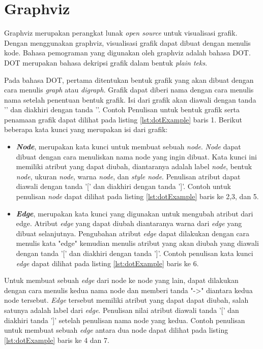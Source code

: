 \section{Graphviz}\cite{Graph}
Graphviz merupakan perangkat lunak \textsl{open source} untuk visualisasi grafik. Dengan menggunakan graphviz, visualisasi grafik dapat dibuat dengan menulis kode. Bahasa pemograman yang digunakan oleh graphviz adalah bahasa DOT. DOT merupakan bahasa dekripsi grafik dalam bentuk \textsl{plain teks}. 

Pada bahasa DOT, pertama ditentukan bentuk grafik yang akan dibuat dengan cara menulis \textsl{graph} atau \textsl{digraph}. Grafik dapat diberi nama dengan cara menulis nama setelah penentuan bentuk grafik. Isi dari grafik akan diawali dengan tanda '{' dan diakhiri dengan tanda '}'. Contoh Penulisan untuk bentuk grafik serta penamaan grafik dapat dilihat pada listing \ref{lst:dotExample} baris 1. Berikut beberapa kata kunci yang merupakan isi dari grafik:

\begin{itemize}
	\item \textbf{\textsl{Node}}, merupakan kata kunci untuk membuat sebuah \textsl{node}. \textsl{Node} dapat dibuat dengan cara menuliskan nama node yang ingin dibuat. Kata kunci ini memiliki atribut yang dapat diubah, diantaranya adalah label \textsl{node}, bentuk \textsl{node}, ukuran \textsl{node}, warna \textsl{node}, dan \textsl{style node}. Penulisan atribut dapat diawali dengan tanda '[' dan diakhiri dengan tanda ']'. Contoh untuk penulisan \textsl{node} dapat dilihat pada listing \ref{lst:dotExample} baris ke 2,3, dan 5.
	\item \textbf{\textsl{Edge}}, merupakan kata kunci yang digunakan untuk mengubah atribut dari edge. Atribut \textsl{edge} yang dapat diubah diantaranya warna dari \textsl{edge} yang dibuat selanjutnya. Pengubahan atribut \textsl{edge} dapat dilakukan dengan cara menulis kata "edge" kemudian menulis atribut yang akan diubah yang diawali dengan tanda '[' dan diakhiri dengan tanda ']'. Contoh penulisan kata kunci \textsl{edge} dapat dilihat pada listing \ref{lst:dotExample} baris ke 6.
\end{itemize}

Untuk membuat sebuah \textsl{edge} dari node ke node yang lain, dapat dilakukan dengan cara menulis kedua nama node dan memberi tanda "->" diantara kedua node tersebut. \textsl{Edge} tersebut memiliki atribut yang dapat dapat diubah, salah satunya adalah label dari \textsl{edge}. Penulisan nilai atribut diawali tanda '[' dan diakhiri tanda ']' setelah penulisan nama node yang kedua. Contoh penulisan untuk membuat sebuah \textsl{edge} antara dua node dapat dilihat pada listing \ref{lst:dotExample} baris ke 4 dan 7.

